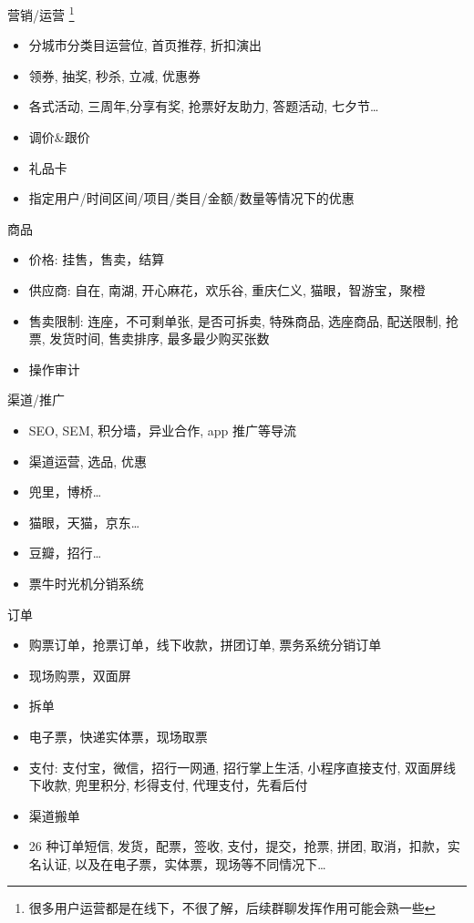\documentclass[presentation, bigger]{beamer}
\begin{document}
\begin{frame}[label={sec:org8373e05}]{营销/运营 \footnote{很多用户运营都是在线下，不很了解，后续群聊发挥作用可能会熟一些}}
\begin{itemize}
\item 分城市分类目运营位, 首页推荐, 折扣演出
\item 领券, 抽奖, 秒杀, 立减, 优惠券
\item 各式活动, 三周年,分享有奖, 抢票好友助力, 答题活动, 七夕节\ldots{}
\item 调价\&跟价
\item 礼品卡
\item 指定用户/时间区间/项目/类目/金额/数量等情况下的优惠
\end{itemize}
\end{frame}
\begin{frame}[label={sec:org9f66de9}]{商品}
\begin{itemize}
\item 价格: 挂售，售卖，结算
\item 供应商: 自在, 南湖, 开心麻花，欢乐谷, 重庆仁义, 猫眼，智游宝，聚橙
\item 售卖限制: 连座，不可剩单张, 是否可拆卖, 特殊商品, 选座商品, 配送限制, 抢票, 发货时间, 售卖排序, 最多最少购买张数
\item 操作审计
\end{itemize}
\end{frame}
\begin{frame}[label={sec:org2dee2d2}]{渠道/推广}
\begin{itemize}
\item SEO, SEM, 积分墙，异业合作, app 推广等导流
\item 渠道运营, 选品, 优惠
\item 兜里，博桥\ldots{}
\item 猫眼，天猫，京东\ldots{}
\item 豆瓣，招行\ldots{}
\item 票牛时光机分销系统
\end{itemize}
\end{frame}

\begin{frame}[label={sec:org45eaa3d}]{订单}
\begin{itemize}
\item 购票订单，抢票订单，线下收款，拼团订单, 票务系统分销订单
\item 现场购票，双面屏
\item 拆单
\item 电子票，快递实体票，现场取票
\item 支付: 支付宝，微信，招行一网通, 招行掌上生活, 小程序直接支付, 双面屏线下收款, 兜里积分, 杉得支付, 代理支付，先看后付
\item 渠道搬单
\item 26 种订单短信, 发货，配票，签收, 支付，提交，抢票, 拼团, 取消，扣款，实名认证, 以及在电子票，实体票，现场等不同情况下\ldots{}
\end{itemize}
\end{frame}
\end{document}
